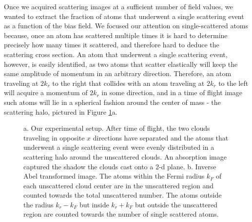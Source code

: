 \documentclass[12pt]{iopart}
\begin{document}
\par Once we acquired scattering images at a sufficient number of field values, we wanted to extract the fraction of atoms that underwent a single scattering event as a function of the bias field. We focused our attention on single-scattered atoms because, once an atom has scattered multiple times it is hard to determine precisely how many times it scattered, and therefore hard to deduce the scattering cross section.  An atom that underwent a single scattering event, however, is easily identified, as two atoms that scatter elastically will keep the same amplitude of momentum in an arbitrary direction. Therefore, an atom traveling at $2k_r$ to the right that collides with an atom traveling at $2k_r$ to the left will acquire a momentum of $2k_r$ in some direction, and in a time of flight image such atoms will lie in a spherical fashion around the center of mass -  the scattering halo, pictured in Figure \ref{fig:halo}a. 
\begin{figure}
\caption{a. Our experimental setup. After time of flight, the two clouds traveling in opposite $x$ directions have separated and the atoms that underwent a single scattering event were evenly distributed in a scattering halo around the unscattered clouds. An absorption image captured the shadow the clouds cast onto a 2-d plane. b. Inverse Abel transformed image. The atoms within the Fermi radius $k_F$ of each unscattered cloud center are in the unscattered region and counted towards the total unscattered number. The atoms outside the radius $k_r-k_F$ but inside $k_r+k_F$ but outside the unscattered region are counted towards the number of single scattered atoms.   }  
\label{fig:halo}
\end{figure}
\end{document}
